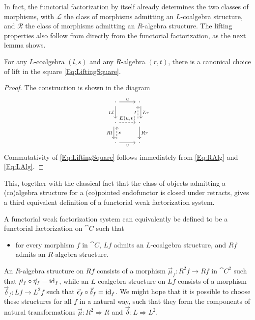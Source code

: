 In fact, the functorial factorization by itself already determines the two classes of morphisms, with $\mathcal{L}$ the class of morphisms admitting an $L$-coalgebra structure, and $\mathcal{R}$ the class of morphisms admitting an $R$-algebra structure. The lifting properties also follow from directly from the functorial factorization, as the next lemma shows.

\begin{lemma}
	For any $L$-coalgebra $(l,s)$ and any $R$-algebra $(r,t)$, there is a canonical choice of lift in the square \eqref{Eq:LiftingSquare}.
\end{lemma}
\begin{proof}
	The construction is shown in the diagram
	\begin{equation}\label{Eq:CanonicalLift}
	\begin{tikzcd}
		\cdot 	\rar{u} 
				\dar[swap]{Ll} 
			& \cdot \dar[xshift=0.5ex]{Lr} \\
		\cdot 	\rar[dashed]{E(u,v)} 
				\dar[xshift=-0.5ex][swap]{Rl} 
			& \cdot \uar[xshift=-0.5ex,dashed]{t} 
				\dar{Rr} \\
		\cdot 	\uar[xshift=0.5ex,dashed][swap]{s}
				\rar[swap]{v}
			& \cdot
	\end{tikzcd}
	\end{equation}
	Commutativity of \eqref{Eq:LiftingSquare} follows immediately from \eqref{Eq:RAlg} and \eqref{Eq:LAlg}.
\end{proof}

This, together with the classical fact that the class of objects admitting a (co)algebra structure for a (co)pointed endofunctor is closed under retracts, gives a third equivalent definition of a functorial weak factorization system.

\begin{lemma}
	A functorial weak factorization system can equivalently be defined to be a functorial factorization on $\cat{C}$ such that
	\begin{itemize}
		\item for every morphism $f$ in $\cat{C}$, $Lf$ admits an $L$-coalgebra structure, and $Rf$ admits an $R$-algebra structure.
	\end{itemize}
\end{lemma}

An $R$-algebra structure on $Rf$ consists of a morphism $\vec{\mu}_f\colon R^2f\to Rf$ in $\cat{C}^2$ such that $\vec{\mu}_f\circ\vec{\eta}_f=\operatorname{id}_f$, while an $L$-coalgebra structure on $Lf$ consists of a morphism $\vec{\delta}_f\colon Lf\to L^2f$ such that $\vec{\epsilon}_f\circ\vec{\delta}_f=\operatorname{id}_f$. We might hope that it is possible to choose these structures for all $f$ in a natural way, such that they form the components of natural transformations $\vec{\mu}\colon R^2\Rightarrow R$ and $\vec{\delta}\colon L\Rightarrow L^2$.

